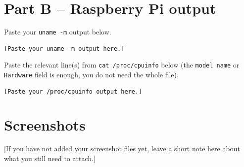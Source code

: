 \documentclass[11pt]{article}
\begin{document}
\section{Part B -- Raspberry Pi output}
Paste your \texttt{uname -m} output below.
\begin{lstlisting}
[Paste your uname -m output here.]
\end{lstlisting}

Paste the relevant line(s) from \texttt{cat /proc/cpuinfo} below (the
\texttt{model name} or \texttt{Hardware} field is enough, you do not need
the whole file).
\begin{lstlisting}
[Paste your /proc/cpuinfo output here.]
\end{lstlisting}

\section{Screenshots}



[If you have not added your screenshot files yet, leave a short note
here about what you still need to attach.]
\end{document}

